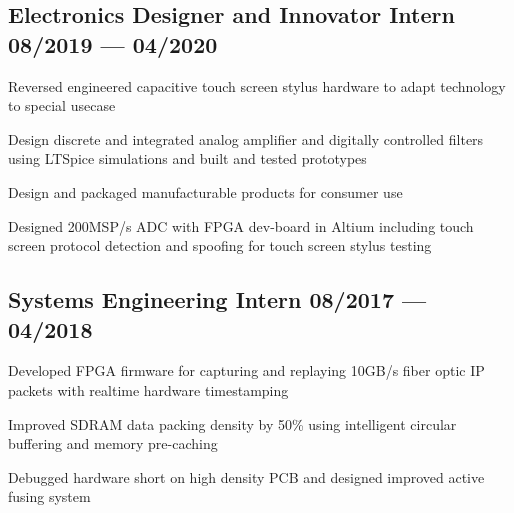 \documentclass[letter,10pt]{article}
\begin{document}
\subsection{{Electronics Designer and Innovator Intern \hfill 08/2019 --- 04/2020}}
\begin{zitemize}
\item Reversed engineered capacitive touch screen stylus hardware to adapt technology to special usecase
\item Design discrete and integrated analog amplifier and digitally controlled filters using LTSpice simulations and built and tested prototypes
\item Design and packaged manufacturable products for consumer use
\item Designed 200MSP/s ADC with FPGA dev-board in Altium including touch screen protocol detection and spoofing for touch screen stylus testing
\end{zitemize}

\subsection{{Systems Engineering Intern \hfill 08/2017 --- 04/2018}}
\begin{zitemize}
\item Developed FPGA firmware for capturing and replaying 10GB/s fiber optic IP packets with realtime hardware timestamping
\item Improved SDRAM data packing density by 50\% using intelligent circular buffering and memory pre-caching
\item Debugged hardware short on high density PCB and designed improved active fusing system
\end{zitemize}
\end{document}
